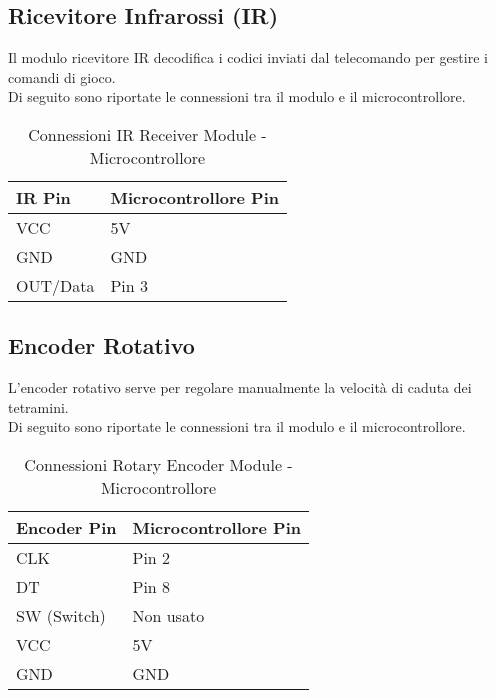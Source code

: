 \documentclass[a4paper, 12pt]{article}
\begin{document}
\subsection{Ricevitore Infrarossi (IR)}
Il modulo ricevitore IR decodifica i codici inviati dal telecomando per gestire i comandi di gioco.\\
Di seguito sono riportate le connessioni tra il modulo e il microcontrollore.
\begin{table}[H]
    \centering
    \caption{Connessioni IR Receiver Module - Microcontrollore}
    \label{tab:ir-receiver-connections}
    \begin{tabular}{ll}
        \toprule
        \textbf{IR Pin} & \textbf{Microcontrollore Pin} \\
        \midrule
        VCC             & 5V                            \\
        GND             & GND                           \\
        OUT/Data        & Pin 3                         \\
        \bottomrule
    \end{tabular}
\end{table}

\subsection{Encoder Rotativo}
L'encoder rotativo serve per regolare manualmente la velocità di caduta dei tetramini.\\
Di seguito sono riportate le connessioni tra il modulo e il microcontrollore.
\begin{table}[H]
    \centering
    \caption{Connessioni Rotary Encoder Module - Microcontrollore}
    \label{tab:rotary-encoder-connections}
    \begin{tabular}{ll}
        \toprule
        \textbf{Encoder Pin} & \textbf{Microcontrollore Pin} \\
        \midrule
        CLK                  & Pin 2                         \\
        DT                   & Pin 8                         \\
        SW (Switch)          & Non usato                     \\
        VCC                  & 5V                            \\
        GND                  & GND                           \\
        \bottomrule
    \end{tabular}
\end{table}
\end{document}
